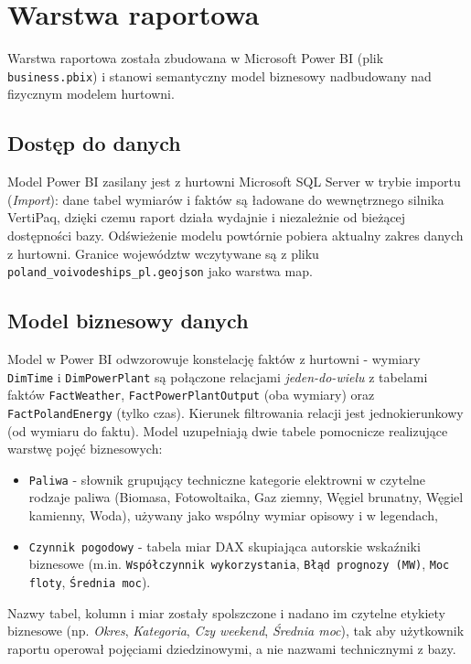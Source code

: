 \documentclass[12pt]{article}
\begin{document}
	\section{Warstwa raportowa}
	\label{sec:reportlayer}

	Warstwa raportowa została zbudowana w Microsoft Power BI (plik \texttt{business.pbix}) i stanowi semantyczny model biznesowy nadbudowany nad fizycznym modelem hurtowni.

	\subsection{Dostęp do danych}
	Model Power BI zasilany jest z hurtowni Microsoft SQL Server w trybie importu (\textit{Import}): dane tabel wymiarów i faktów są ładowane do wewnętrznego silnika VertiPaq, dzięki czemu raport działa wydajnie i niezależnie od bieżącej dostępności bazy. Odświeżenie modelu powtórnie pobiera aktualny zakres danych z hurtowni. Granice województw wczytywane są z pliku \texttt{poland\_voivodeships\_pl.geojson} jako warstwa map.

	\subsection{Model biznesowy danych}
	Model w Power BI odwzorowuje konstelację faktów z hurtowni - wymiary \texttt{DimTime} i \texttt{DimPowerPlant} są połączone relacjami \textit{jeden-do-wielu} z tabelami faktów \texttt{FactWeather}, \texttt{FactPowerPlantOutput} (oba wymiary) oraz \texttt{FactPolandEnergy} (tylko czas). Kierunek filtrowania relacji jest jednokierunkowy (od wymiaru do faktu). Model uzupełniają dwie tabele pomocnicze realizujące warstwę pojęć biznesowych:
	\begin{itemize}
		\item \texttt{Paliwa} - słownik grupujący techniczne kategorie elektrowni w czytelne rodzaje paliwa (Biomasa, Fotowoltaika, Gaz ziemny, Węgiel brunatny, Węgiel kamienny, Woda), używany jako wspólny wymiar opisowy i w legendach,
		\item \texttt{Czynnik pogodowy} - tabela miar DAX skupiająca autorskie wskaźniki biznesowe (m.in. \texttt{Współczynnik wykorzystania}, \texttt{Błąd prognozy (MW)}, \texttt{Moc floty}, \texttt{Średnia moc}).
	\end{itemize}
	Nazwy tabel, kolumn i miar zostały spolszczone i nadano im czytelne etykiety biznesowe (np. \textit{Okres}, \textit{Kategoria}, \textit{Czy weekend}, \textit{Średnia moc}), tak aby użytkownik raportu operował pojęciami dziedzinowymi, a nie nazwami technicznymi z bazy.
\end{document}
